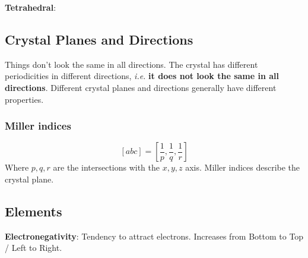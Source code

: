\documentclass[a4paper, fontsize=8pt, landscape, DIV=1]{scrartcl}
\begin{document}
\begin{multicols*}{4}
  \textbf{Tetrahedral}:

  \subsection{Crystal Planes and Directions}
  Things don't look the same in all directions. The crystal has different periodicities in different directions, \textit{i.e.} \textbf{it does not look the same in all directions}. Different crystal planes and directions generally have different properties.
  
  \subsubsection{Miller indices}
  \[[abc] = \left[\frac{1}{p},\frac{1}{q},\frac{1}{r}\right]\]
  Where $p,q,r$ are the intersections with the $x,y,z$ axis. Miller indices describe the crystal plane.

  \subsection{Elements}
  \textbf{Electronegativity}: Tendency to attract electrons. Increases from Bottom to Top / Left to Right.



\end{multicols*}
\end{document}
